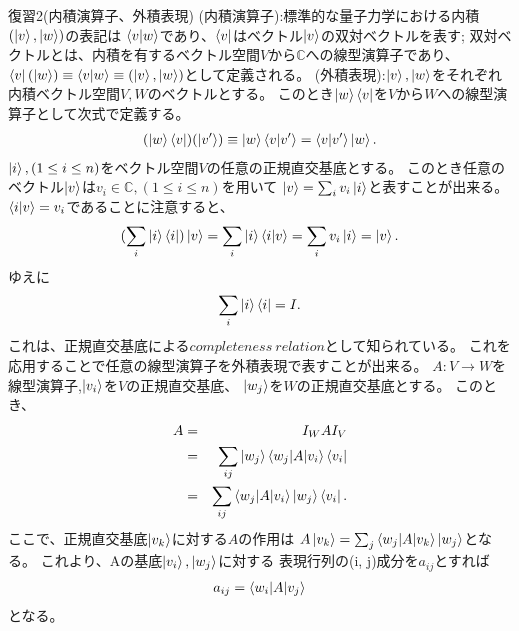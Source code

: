 {\Large 復習2(内積演算子、外積表現)}
\newline
(内積演算子):標準的な量子力学における内積$(\ket{v}, \ket{w})$の表記は
$\braket{v|w}$であり、$\bra{v}$はベクトル$\ket{v}$の双対ベクトルを表す;
双対ベクトルとは、内積を有するベクトル空間$V$から$\mathbb{C}$への線型演算子であり、
$\bra{v}(\ket{w}) \equiv \braket{v|w} \equiv (\ket{v}, \ket{w})$として定義される。
\newline
(外積表現):$\ket{v}, \ket{w}$をそれぞれ内積ベクトル空間$V, W$のベクトルとする。
このとき$\ket{w}\bra{v}$を$V$から$W$への線型演算子として次式で定義する。
\begin{eqnarray*}
(\ket{w}\bra{v})(\ket{v'}) \equiv \ket{w} \braket{v|v'} = \braket{v|v'}\ket{w}.
\end{eqnarray*}
$\ket{i}, (1\leq i\leq n)$をベクトル空間$V$の任意の正規直交基底とする。
このとき任意のベクトル$\ket{v}$は$v_i \in \mathbb{C}, (1\leq i\leq n)$を用いて
$\ket{v} = \sum_i v_i \ket{i}$と表すことが出来る。
$\braket{i|v} = v_i$であることに注意すると、
\begin{eqnarray*}
(\sum_i \ket{i} \bra{i}) \ket{v} = \sum_i \ket{i} \braket{i|v} = \sum_i v_i \ket{i}
= \ket{v}.
\end{eqnarray*}
ゆえに
\begin{eqnarray*}
\sum_i \ket{i} \bra{i} = I.
\end{eqnarray*}
これは、正規直交基底による$completeness~relation$として知られている。
これを応用することで任意の線型演算子を外積表現で表すことが出来る。
\newline
$A:V \to W$を線型演算子,$\ket{v_i}$を$V$の正規直交基底、
$\ket{w_j}$を$W$の正規直交基底とする。
このとき、
\begin{eqnarray*}
A &=& I_W A I_V \\
&=& \sum_{ij} \ket{w_j} \braket{w_j|A|v_i} \bra{v_i} \\
&=& \sum_{ij} \braket{w_j|A|v_i} \ket{w_j} \bra{v_i}.
\end{eqnarray*}
ここで、正規直交基底$\ket{v_k}$に対する$A$の作用は
$A\ket{v_k} = \sum_j \braket{w_j|A|v_k}\ket{w_j}$となる。
これより、Aの基底$\ket{v_i}, \ket{w_j}$に対する
表現行列の(i, j)成分を$a_{ij}$とすれば
\begin{eqnarray*}
a_{ij} = \braket{w_i|A|v_j}
\end{eqnarray*}
となる。

